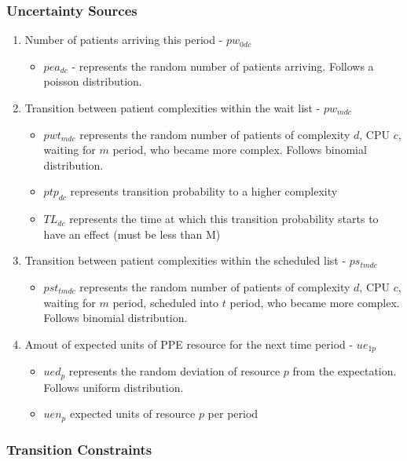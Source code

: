 \documentclass{article}
\begin{document}
\subsubsection{Uncertainty Sources}
\begin{enumerate}
    	
	\item Number of patients arriving this period - $pw_{0dc}$
		\begin{itemize}
			\item $pea_{dc}$ - represents the random number of patients arriving. Follows a poisson distribution.
		\end{itemize}
	
	\item Transition between patient complexities within the wait list - $pw_{mdc}$
		\begin{itemize}
			\item $pwt_{mdc}$ represents the random number of patients of complexity $d$, CPU $c$, waiting for $m$ period, who became more complex. Follows binomial distribution.
			\item $ptp_{dc}$ represents transition probability to a higher complexity
			\item $TL_{dc}$ represents the time at which this transition probability starts to have an effect (must be less than M)
		\end{itemize}
		
	\item Transition between patient complexities within the scheduled list - $ps_{tmdc}$
		\begin{itemize}
			\item $pst_{tmdc}$ represents the random number of patients of complexity $d$, CPU $c$, waiting for $m$ period, scheduled into $t$ period, who became more complex. Follows binomial distribution.
		\end{itemize}

	\item Amout of expected units of PPE resource for the next time period - $ue_{1p}$
		\begin{itemize}
			\item $ued_{p}$ represents the random deviation of resource $p$ from the expectation. Follows uniform distribution.
			\item $uen_{p}$ expected units of resource $p$ per period
		\end{itemize}
\end{enumerate}

\subsubsection{Transition Constraints}
\end{document}

